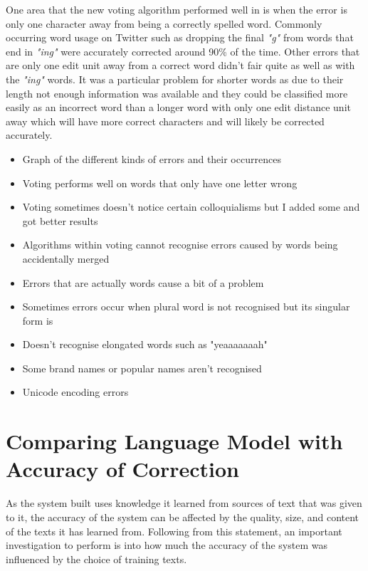 One area that the new voting algorithm performed well in is when the error is only one character away from being a correctly spelled word. Commonly occurring word usage on Twitter such as dropping the final \emph{"g"} from words that end in \emph{"ing"} were accurately corrected around 90\% of the time. Other errors that are only one edit unit away from a correct word didn't fair quite as well as with the \emph{"ing"} words. It was a particular problem for shorter words as due to their length not enough information was available and they could be classified more easily as an incorrect word than a longer word with only one edit distance unit away which will have more correct characters and will likely be corrected accurately.

\begin{itemize}
\item Graph of the different kinds of errors and their occurrences
\item Voting performs well on words that only have one letter wrong
\item Voting sometimes doesn't notice certain colloquialisms but I added some and got better results
\item Algorithms within voting cannot recognise errors caused by words being accidentally merged
\item Errors that are actually words cause a bit of a problem
\item Sometimes errors occur when plural word is not recognised but its singular form is
\item Doesn't recognise elongated words such as "yeaaaaaaah"
\item Some brand names or popular names aren't recognised
\item Unicode encoding errors
\end{itemize}

\section{Comparing Language Model with Accuracy of Correction}
As the system built uses knowledge it learned from sources of text that was given to it, the accuracy of the system can be affected by the quality, size, and content of the texts it has learned from. Following from this statement, an important investigation to perform is into how much the accuracy of the system was influenced by the choice of training texts.

